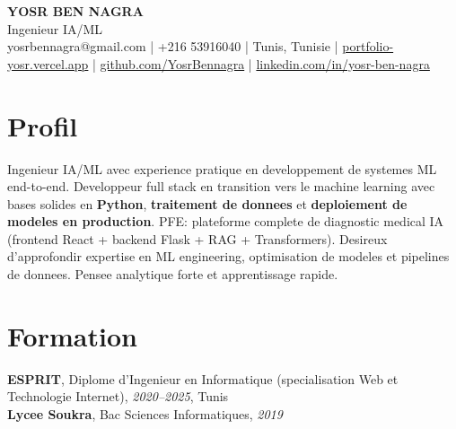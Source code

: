 \documentclass[10pt,a4paper]{article}
\begin{document}
\begin{center}
  {\Large\bfseries YOSR BEN NAGRA}\\[2pt]
  {\small Ingenieur IA/ML}\\[3pt]
  {\footnotesize yosrbennagra@gmail.com \;|\; +216 53916040 \;|\; Tunis, Tunisie \;|\; \href{https://portfolio-yosr.vercel.app/fr}{portfolio-yosr.vercel.app} \;|\; \href{https://github.com/YosrBennagra}{github.com/YosrBennagra} \;|\; \href{https://www.linkedin.com/in/yosr-ben-nagra/}{linkedin.com/in/yosr-ben-nagra}}
\end{center}

\section*{Profil}
{\small
Ingenieur IA/ML avec experience pratique en developpement de systemes ML end-to-end. Developpeur full stack en transition vers le machine learning avec bases solides en \textbf{Python}, \textbf{traitement de donnees} et \textbf{deploiement de modeles en production}. PFE: plateforme complete de diagnostic medical IA (frontend React + backend Flask + RAG + Transformers). Desireux d'approfondir expertise en ML engineering, optimisation de modeles et pipelines de donnees. Pensee analytique forte et apprentissage rapide.
}

\vspace{4pt}

\section*{Formation}
{\small
\textbf{ESPRIT}, Diplome d'Ingenieur en Informatique (specialisation Web et Technologie Internet), \textit{2020--2025}, Tunis\\[1pt]
\textbf{Lycee Soukra}, Bac Sciences Informatiques, \textit{2019}
}

\vspace{4pt}

\end{document}
